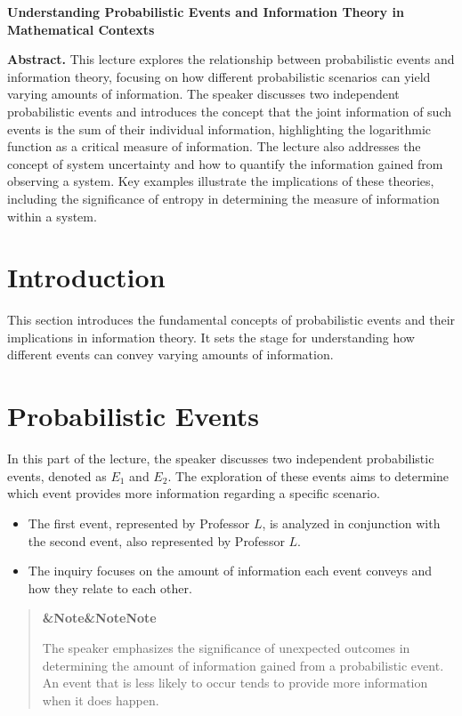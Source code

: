 \documentclass[a4paper]{article}
\newcommand{\boxheading}[1]{%
  \par\smallskip
  \noindent\textbf{\ifx&#1&Note\else#1\fi}\par
  \smallskip
}
\newenvironment{rembox}[1][]{%
  \begin{quote}\color{black!70}\boxheading{#1}\normalcolor
}{\end{quote}}
\begin{document}
\begin{center}
{\LARGE \textbf{Understanding Probabilistic Events and Information Theory in Mathematical Contexts}}\\[1em]
\end{center}

\textbf{Abstract.} This lecture explores the relationship between probabilistic events and information theory, focusing on how different probabilistic scenarios can yield varying amounts of information. The speaker discusses two independent probabilistic events and introduces the concept that the joint information of such events is the sum of their individual information, highlighting the logarithmic function as a critical measure of information. The lecture also addresses the concept of system uncertainty and how to quantify the information gained from observing a system. Key examples illustrate the implications of these theories, including the significance of entropy in determining the measure of information within a system.

\section{Introduction}
This section introduces the fundamental concepts of probabilistic events and their implications in information theory. It sets the stage for understanding how different events can convey varying amounts of information.

\section{Probabilistic Events}
In this part of the lecture, the speaker discusses two independent probabilistic events, denoted as \(E_1\) and \(E_2\). The exploration of these events aims to determine which event provides more information regarding a specific scenario.

\begin{itemize}
    \item The first event, represented by Professor \(L\), is analyzed in conjunction with the second event, also represented by Professor \(L\).
    \item The inquiry focuses on the amount of information each event conveys and how they relate to each other.
\end{itemize}

\begin{rembox}[Note]
The speaker emphasizes the significance of unexpected outcomes in determining the amount of information gained from a probabilistic event. An event that is less likely to occur tends to provide more information when it does happen.
\end{rembox}
\end{document}
